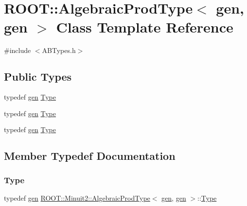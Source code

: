 \hypertarget{classROOT_1_1Minuit2_1_1AlgebraicProdType_3_01gen_00_01gen_01_4}{}\section{R\+O\+OT\+:\+:Algebraic\+Prod\+Type$<$ gen, gen $>$ Class Template Reference}
\label{classROOT_1_1Minuit2_1_1AlgebraicProdType_3_01gen_00_01gen_01_4}


{\ttfamily \#include $<$A\+B\+Types.\+h$>$}

\subsection*{Public Types}
\begin{DoxyCompactItemize}
\item 
typedef \mbox{\hyperlink{classROOT_1_1Minuit2_1_1gen}{gen}} \mbox{\hyperlink{classROOT_1_1Minuit2_1_1AlgebraicProdType_3_01gen_00_01gen_01_4_a423aa1dfc05f189aa1a3809d355a5efe}{Type}}
\item 
typedef \mbox{\hyperlink{classROOT_1_1Minuit2_1_1gen}{gen}} \mbox{\hyperlink{classROOT_1_1Minuit2_1_1AlgebraicProdType_3_01gen_00_01gen_01_4_a423aa1dfc05f189aa1a3809d355a5efe}{Type}}
\item 
typedef \mbox{\hyperlink{classROOT_1_1Minuit2_1_1gen}{gen}} \mbox{\hyperlink{classROOT_1_1Minuit2_1_1AlgebraicProdType_3_01gen_00_01gen_01_4_a423aa1dfc05f189aa1a3809d355a5efe}{Type}}
\end{DoxyCompactItemize}


\subsection{Member Typedef Documentation}
\mbox{\label{classROOT_1_1Minuit2_1_1AlgebraicProdType_3_01gen_00_01gen_01_4_a423aa1dfc05f189aa1a3809d355a5efe}} 
\subsubsection{\texorpdfstring{Type}{Type}\hspace{0.1cm}{\footnotesize\ttfamily [1/3]}}
{\footnotesize\ttfamily typedef \mbox{\hyperlink{classROOT_1_1Minuit2_1_1gen}{gen}} \mbox{\hyperlink{classROOT_1_1Minuit2_1_1AlgebraicProdType}{R\+O\+O\+T\+::\+Minuit2\+::\+Algebraic\+Prod\+Type}}$<$ \mbox{\hyperlink{classROOT_1_1Minuit2_1_1gen}{gen}}, \mbox{\hyperlink{classROOT_1_1Minuit2_1_1gen}{gen}} $>$\+::\mbox{\hyperlink{classROOT_1_1Minuit2_1_1AlgebraicProdType_3_01gen_00_01gen_01_4_a423aa1dfc05f189aa1a3809d355a5efe}{Type}}}

